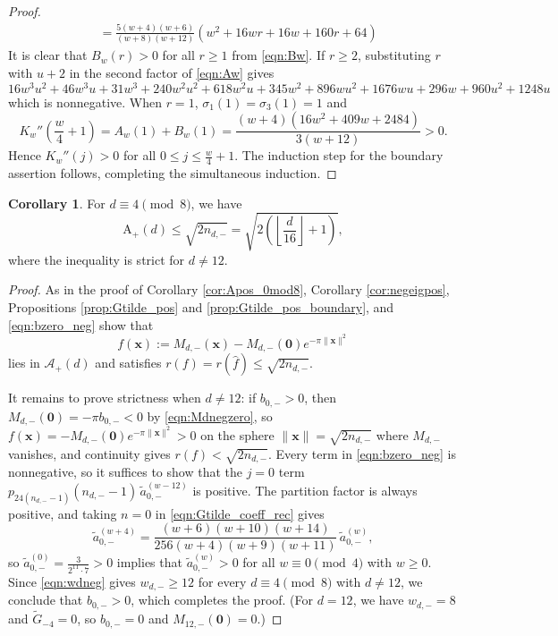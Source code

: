 \documentclass[10pt,reqno]{amsproc}
\newcommand{\what}[1]{\widehat{#1}}
\newcommand{\wtilde}{\widetilde}
\newcommand{\rA}{\mathrm{A}}
\newcommand{\bx}{\mathbf{x}}
\newcommand{\1}{\mathds{1}}	%
\theoremstyle{definition}
\newtheorem{corollary}[theorem]{Corollary}
\theoremstyle{remark}
\begin{document}
\begin{proof}
\begin{align}
        &= \frac{5(w+4)(w+6)}{(w+8)(w+12)} (w^2 + 16wr + 16w + 160r + 64) \label{eqn:Bw}
    \end{align}
    It is clear that $B_w(r) > 0$ for all $r \ge 1$ from \eqref{eqn:Bw}.
    If $r \ge 2$, substituting $r$ with $u + 2$ in the second factor of \eqref{eqn:Aw} gives
    \[
    16w^3 u^2 + 46w^3 u + 31w^3 + 240 w^2 u^2 + 618w^2u + 345w^2 + 896wu^2 + 1676 wu + 296 w + 960 u^2 + 1248u
    \]
    which is nonnegative.
    When $r = 1$, $\sigma_1(1) = \sigma_3(1) = 1$ and
    \[
    K_w''\left(\frac{w}{4}+1\right) = A_w(1) + B_w(1) = \frac{(w+4)(16w^2 + 409w + 2484)}{3(w+12)} > 0.
    \]
    Hence $K_w''(j) > 0$ for all $0 \le j \le \frac{w}{4} + 1$.
    The induction step for the boundary assertion follows, completing the simultaneous induction.
\end{proof}


\begin{corollary}
    \label{cor:Apos_4mod8}
    For $d \equiv 4 \pmod{8}$, we have
    \[
    \rA_+(d) \le \sqrt{2n_{d,-}} = \sqrt{2\left(\left\lfloor \frac{d}{16} \right\rfloor + 1\right)},
    \]
    where the inequality is strict for $d \ne 12$.
\end{corollary}
\begin{proof}
    As in the proof of Corollary \ref{cor:Apos_0mod8}, Corollary \ref{cor:negeigpos}, Propositions \ref{prop:Gtilde_pos} and \ref{prop:Gtilde_pos_boundary}, and \eqref{eqn:bzero_neg} show that
    \[
        f(\bx) := M_{d,-}(\bx) - M_{d,-}(\mathbf{0}) e^{-\pi \|\bx\|^2}
    \]
    lies in $\mathcal{A}_{+}(d)$ and satisfies $r(f) = r(\what{f}) \le \sqrt{2n_{d,-}}$.

    It remains to prove strictness when $d \neq 12$: if $b_{0,-} > 0$, then $M_{d,-}(\mathbf{0}) = -\pi b_{0,-} < 0$ by \eqref{eqn:Mdnegzero}, so $f(\bx) = -M_{d,-}(\mathbf{0}) e^{-\pi \|\bx\|^2} > 0$ on the sphere $\|\bx\| = \sqrt{2n_{d,-}}$ where $M_{d,-}$ vanishes, and continuity gives $r(f) < \sqrt{2n_{d,-}}$.
    Every term in \eqref{eqn:bzero_neg} is nonnegative, so it suffices to show that the $j = 0$ term $p_{24(n_{d,-} - 1)}(n_{d,-} - 1)\, \tilde{a}_{0,-}^{(w - 12)}$ is positive.
    The partition factor is always positive, and taking $n = 0$ in \eqref{eqn:Gtilde_coeff_rec} gives
    \[
        \tilde{a}_{0,-}^{(w + 4)} = \frac{(w+6)(w+10)(w+14)}{256(w+4)(w+9)(w+11)}\, \tilde{a}_{0,-}^{(w)},
    \]
    so $\tilde{a}_{0,-}^{(0)} = \frac{3}{2^{11} \cdot 7} > 0$ implies that $\tilde{a}_{0,-}^{(w)} > 0$ for all $w \equiv 0 \pmod{4}$ with $w \geq 0$.
    Since \eqref{eqn:wdneg} gives $w_{d,-} \geq 12$ for every $d \equiv 4 \pmod{8}$ with $d \neq 12$, we conclude that $b_{0,-} > 0$, which completes the proof.
    (For $d = 12$, we have $w_{d,-} = 8$ and $\wtilde{G}_{-4} = 0$, so $b_{0,-} = 0$ and $M_{12,-}(\mathbf{0}) = 0$.)
\end{proof}
\end{document}
